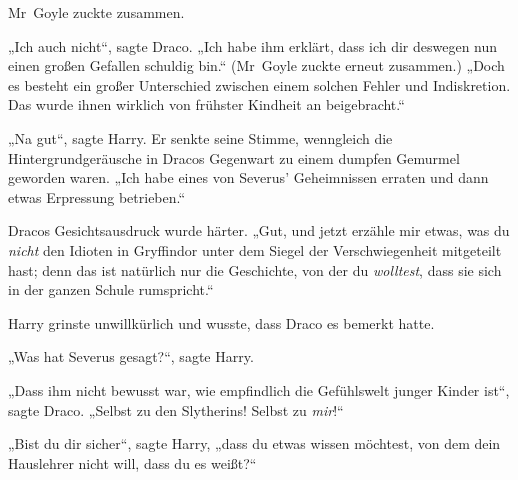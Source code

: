 Mr~Goyle zuckte zusammen.

„Ich auch nicht“, sagte Draco. „Ich habe ihm erklärt, dass ich dir deswegen nun einen großen Gefallen schuldig bin.“ (Mr~Goyle zuckte erneut zusammen.) „Doch es besteht ein großer Unterschied zwischen einem solchen Fehler und Indiskretion. Das wurde ihnen wirklich von frühster Kindheit an beigebracht.“

„Na gut“, sagte Harry. Er senkte seine Stimme, wenngleich die Hintergrundgeräusche in Dracos Gegenwart zu einem dumpfen Gemurmel geworden waren. „Ich habe eines von Severus’ Geheimnissen erraten und dann etwas Erpressung betrieben.“

Dracos Gesichtsausdruck wurde härter. „Gut, und jetzt erzähle mir etwas, was du \emph{nicht} den Idioten in Gryffindor unter dem Siegel der Verschwiegenheit mitgeteilt hast; denn das ist natürlich nur die Geschichte, von der du \emph{wolltest}, dass sie sich in der ganzen Schule rumspricht.“

Harry grinste unwillkürlich und wusste, dass Draco es bemerkt hatte.

„Was hat Severus gesagt?“, sagte Harry.

„Dass ihm nicht bewusst war, wie empfindlich die Gefühlswelt junger Kinder ist“, sagte Draco. „Selbst zu den Slytherins! Selbst zu \emph{mir}!“

„Bist du dir sicher“, sagte Harry, „dass du etwas wissen möchtest, von dem dein Hauslehrer nicht will, dass du es weißt?“

